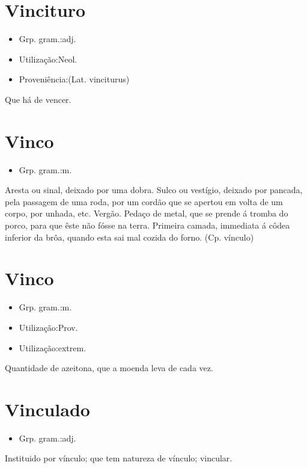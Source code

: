 \documentclass{article}
\begin{document}
\section{Vincituro}
\begin{itemize}
\item {Grp. gram.:adj.}
\end{itemize}
\begin{itemize}
\item {Utilização:Neol.}
\end{itemize}
\begin{itemize}
\item {Proveniência:(Lat. \textunderscore vinciturus\textunderscore )}
\end{itemize}
Que há de vencer.
\section{Vinco}
\begin{itemize}
\item {Grp. gram.:m.}
\end{itemize}
Aresta ou sinal, deixado por uma dobra.
Sulco ou vestígio, deixado por pancada, pela passagem de uma roda, por um cordão que se apertou em volta de um corpo, por unhada, etc.
Vergão.
Pedaço de metal, que se prende á tromba do porco, para que êste não fósse na terra.
Primeira camada, immediata á côdea inferior da brôa, quando esta sai mal cozida do forno.
(Cp. \textunderscore vínculo\textunderscore )
\section{Vinco}
\begin{itemize}
\item {Grp. gram.:m.}
\end{itemize}
\begin{itemize}
\item {Utilização:Prov.}
\end{itemize}
\begin{itemize}
\item {Utilização:extrem.}
\end{itemize}
Quantidade de azeitona, que a moenda leva de cada vez.
\section{Vinculado}
\begin{itemize}
\item {Grp. gram.:adj.}
\end{itemize}
Instituido por vínculo; que tem natureza de vínculo; vincular.
\end{document}
